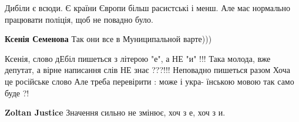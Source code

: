 \begin{itemize}
\begin{itemize}
\end{itemize}

 

Дибіли є всюди. Є країни Європи більш расистські і менш. Але має нормально
працювати поліція, щоб не повадно було.

\begin{itemize}
 
\textbf{Ксенія Семенова} Так они все в Муниципальной варте)))

 
Ксенія, слово дЕбіл пишеться
з літерою "е", а НЕ "и" !!! Така
молода, вже депутат, а вірне
написання слів НЕ знає ???!!!
Неповадно пишеться разом
Хоча це російське слово Але
треба перевірити : може і укра-
їнською мовою так само буде ?!

 
\textbf{Zoltan Justice} Значення сильно не змінює, хоч з е, хоч з и.
\end{itemize}

\end{itemize}

